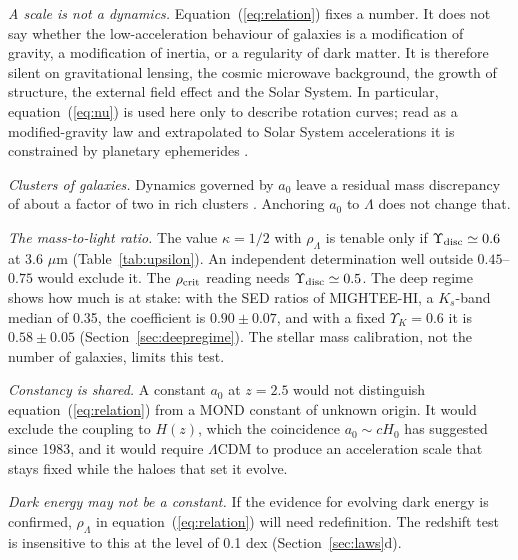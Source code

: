 \documentclass[fleqn,usenatbib]{mnras}
\begin{document}
\emph{A scale is not a dynamics.} Equation~(\ref{eq:relation}) fixes a number. It does not say whether the low-acceleration behaviour of galaxies is a modification of gravity, a modification of inertia, or a regularity of dark matter. It is therefore silent on gravitational lensing, the cosmic microwave background, the growth of structure, the external field effect \citep{Chae2020} and the Solar System. In particular, equation~(\ref{eq:nu}) is used here only to describe rotation curves; read as a modified-gravity law and extrapolated to Solar System accelerations it is constrained by planetary ephemerides \citep{Hees2016}.

\emph{Clusters of galaxies.} Dynamics governed by $a_0$ leave a residual mass discrepancy of about a factor of two in rich clusters \citep{SandersMcGaugh2002,FamaeyMcGaugh2012}. Anchoring $a_0$ to $\Lambda$ does not change that.

\emph{The mass-to-light ratio.} The value $\kappa=1/2$ with $\rho_\Lambda$ is tenable only if $\Upsilon_{\rm disc}\simeq0.6$ at 3.6 $\mu$m (Table~\ref{tab:upsilon}). An independent determination well outside $0.45$--$0.75$ would exclude it. The $\rho_{\rm crit}$ reading needs $\Upsilon_{\rm disc}\simeq0.5$. The deep regime shows how much is at stake: with the SED ratios of MIGHTEE-HI, a $K_s$-band median of 0.35, the coefficient is $0.90\pm0.07$, and with a fixed $\Upsilon_K=0.6$ it is $0.58\pm0.05$ (Section~\ref{sec:deepregime}). The stellar mass calibration, not the number of galaxies, limits this test.

\emph{Constancy is shared.} A constant $a_0$ at $z=2.5$ would not distinguish equation~(\ref{eq:relation}) from a MOND constant of unknown origin. It would exclude the coupling to $H(z)$, which the coincidence $a_0\sim cH_0$ has suggested since 1983, and it would require $\Lambda$CDM to produce an acceleration scale that stays fixed while the haloes that set it evolve.

\emph{Dark energy may not be a constant.} If the evidence for evolving dark energy \citep{DESI2025} is confirmed, $\rho_\Lambda$ in equation~(\ref{eq:relation}) will need redefinition. The redshift test is insensitive to this at the level of 0.1 dex (Section~\ref{sec:laws}d).

\end{document}

